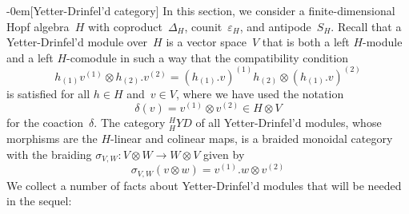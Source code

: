 \documentclass{article}
\makeatletter
\renewcommand{\subsection}{\@startsection{subsection}{2}{0em}%
{\baselineskip}{-0em}{\bfseries\normalsize}}
\newcounter{num}
\newcounter{num1}
\numberwithin{equation}{section}
\theoremstyle{definition}
\theoremstyle{break}
\newcommand{\ot}{\mathbin{\otimes}}
\newcommand{\1}{{(1)}}
\newcommand{\2}{{(2)}}
\newcommand{\3}{{(3)}}
\newcommand{\eh}{{\varepsilon_{H}}}
\newcommand{\sh}{S_{H}}
\newcommand{\dhh}{\Delta_{H}}
\makeatother
\begin{document}
\subsection[Yetter-Drinfel'd category]{} \label{YetDrinf}
In this section, we consider a finite-dimensional Hopf algebra~$H$ with coproduct~$\dhh$, counit~$\eh$, and antipode~$\sh$. Recall that a Yetter-Drinfel'd module over~$H$ is a vector space~$V$ that is both a left $H$-module and a left $H$-comodule in such a way that the compatibility condition
\begin{equation*}
h_{\1} v^{\1} \ot h_{\2}.v^{\2} =
\left(h_{\1}.v \right)^{\1} h_{\2} \ot \left( h_{\1}.v \right)^{\2}
\end{equation*}
is satisfied for all $h\in H$ and~$v\in V$, where we have used the notation
\begin{equation*}
\delta(v) = v^{\1} \ot v^{\2} \in H \ot V
\end{equation*}
for the coaction~$\delta$. The category $_{H}^{H}YD$ of all Yetter-Drinfel'd modules, whose morphisms are the $H$-linear and colinear maps, is a braided monoidal category with the braiding
$\sigma_{V,W} \colon V \ot W \rightarrow W \ot V$ given by
\begin{equation*}
\sigma_{V,W} \left( v \ot w \right) = v^{\1}.w \ot v^{\2}
\end{equation*}
We collect a number of facts about Yetter-Drinfel'd modules that will be needed in the sequel:
\end{document}
